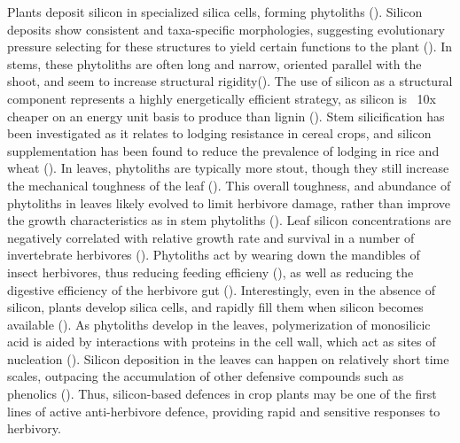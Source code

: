 \documentclass[12pt, letterpaper, ]{report}
\begin{document}
Plants deposit silicon in specialized silica cells, forming phytoliths (\cite{waterman_short-term_2021}). Silicon deposits show consistent and taxa-specific morphologies, suggesting evolutionary pressure selecting for these structures to yield certain functions to the plant (\cite{piperno_phytoliths_2006}). In stems, these phytoliths are often long and narrow, oriented parallel with the shoot, and seem to increase structural rigidity(\cite{stromberg_functions_2016}). The use of silicon as a structural component represents a highly energetically efficient strategy, as silicon is ~10x cheaper on an energy unit basis to produce than lignin (\cite{stromberg_functions_2016}). Stem silicification has been investigated as it relates to lodging resistance in cereal crops, and silicon supplementation has been found to reduce the prevalence of lodging in rice and wheat (\cite{dorairaj_influence_2017,muszynska_mechanistic_2021}). In leaves, phytoliths are typically more stout, though they still increase the mechanical toughness of the leaf (\cite{simpson_still_2017}). This overall toughness, and abundance of phytoliths in leaves likely evolved to limit herbivore damage, rather than improve the growth characteristics as in stem phytoliths (\cite{stromberg_functions_2016}). Leaf silicon concentrations are negatively correlated with relative growth rate and survival in a number of invertebrate herbivores (\cite{juma_influence_2015,massey_silica_2006,mir_silicon_2019}). Phytoliths act by wearing down the mandibles of insect herbivores, thus reducing feeding efficieny (\cite{waterman_short-term_2021-1,mir_silicon_2019}), as well as reducing the digestive efficiency of the herbivore gut (\cite{hunt_novel_2008}). Interestingly, even in the absence of silicon, plants develop silica cells, and rapidly fill them when silicon becomes available (\cite{waterman_short-term_2021-1}). As phytoliths develop in the leaves, polymerization of monosilicic acid is aided by interactions with proteins in the cell wall, which act as sites of nucleation (\cite{nawaz_phytolith_2019}). Silicon deposition in the leaves can happen on relatively short time scales, outpacing the accumulation of other defensive compounds such as phenolics (\cite{waterman_short-term_2021}). Thus, silicon-based defences in crop plants may be one of the first lines of active anti-herbivore defence, providing rapid and sensitive responses to herbivory. 
\end{document}
